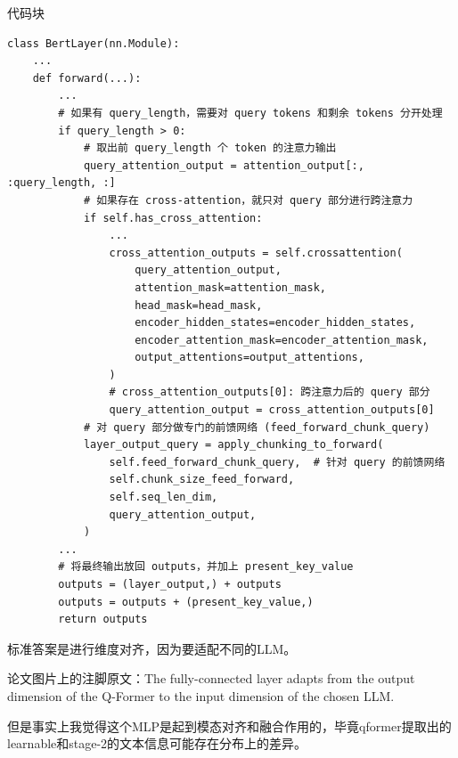 \documentclass[zihao=false,fontset=windows]{ctexart}
\newcommand{\codehead}{{\small\ttfamily\color{feishuGray}代码块}\par\vspace{-0.15em}}
\begin{document}
\begin{feishucode}
\codehead
\begin{lstlisting}
class BertLayer(nn.Module):
    ...
    def forward(...):
        ...
        # 如果有 query_length，需要对 query tokens 和剩余 tokens 分开处理
        if query_length > 0:
            # 取出前 query_length 个 token 的注意力输出
            query_attention_output = attention_output[:, :query_length, :]
            # 如果存在 cross-attention，就只对 query 部分进行跨注意力
            if self.has_cross_attention:
                ...
                cross_attention_outputs = self.crossattention(
                    query_attention_output,
                    attention_mask=attention_mask,
                    head_mask=head_mask,
                    encoder_hidden_states=encoder_hidden_states,
                    encoder_attention_mask=encoder_attention_mask,
                    output_attentions=output_attentions,
                )
                # cross_attention_outputs[0]: 跨注意力后的 query 部分
                query_attention_output = cross_attention_outputs[0]
            # 对 query 部分做专门的前馈网络 (feed_forward_chunk_query)
            layer_output_query = apply_chunking_to_forward(
                self.feed_forward_chunk_query,  # 针对 query 的前馈网络
                self.chunk_size_feed_forward,
                self.seq_len_dim,
                query_attention_output,
            )
        ...
        # 将最终输出放回 outputs，并加上 present_key_value
        outputs = (layer_output,) + outputs
        outputs = outputs + (present_key_value,)
        return outputs
\end{lstlisting}
\end{feishucode}

\par\vspace{0.6em}\par\vspace{0.2em}

标准答案是进行维度对齐，因为要适配不同的LLM。\par

\begin{feishuquote}
论文图片上的注脚原文：The fully-connected layer adapts from the output dimension of the Q-Former to the input dimension of the chosen LLM.\par
\end{feishuquote}

但是事实上我觉得这个MLP是起到模态对齐和融合作用的，毕竟qformer提取出的learnable和stage-2的文本信息可能存在分布上的差异。\par
\end{document}
